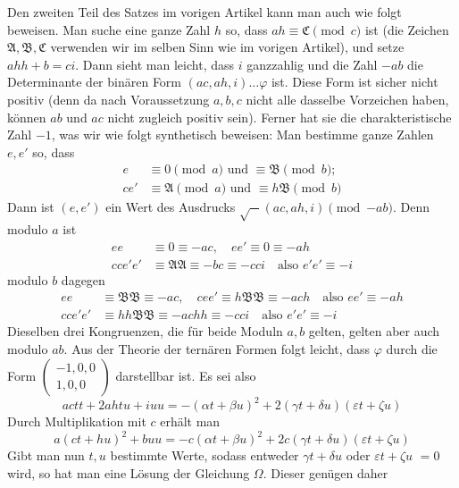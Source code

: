 Den zweiten Teil des Satzes im vorigen Artikel kann man auch
wie folgt beweisen. Man suche eine ganze Zahl \(h\) so,
dass \(ah\equiv\mathfrak C\pmod c\) ist (die Zeichen \(\mathfrak A,\mathfrak B,\mathfrak C\) verwenden wir im selben
Sinn wie im vorigen Artikel), und setze \(ahh+b=ci\). Dann sieht
man leicht, dass \(i\) ganzzahlig und die Zahl \(-ab\) die
Determinante der binären Form \((ac,ah,i)\ldots\varphi\) ist. Diese Form ist
sicher nicht positiv (denn da nach Voraussetzung \(a,b,c\)
nicht alle dasselbe Vorzeichen haben, können \(ab\) und
\(ac\) nicht zugleich positiv sein). Ferner hat sie die
charakteristische Zahl \(-1\), was wir wie folgt synthetisch
beweisen: Man bestimme ganze Zahlen \(e,e'\) so, dass
\[
\begin{aligned}
e&\equiv0\pmod a\text{ und }\equiv\mathfrak B\pmod b;\\
ce'&\equiv\mathfrak A\pmod a\text{ und }\equiv h\mathfrak B\pmod b
\end{aligned}
\]
Dann ist \((e,e')\) ein Wert des Ausdrucks \(\surd-(ac,ah,i)\pmod{-ab}\). Denn modulo
\(a\) ist
\[
\begin{aligned}
ee&\equiv0\equiv-ac,\quad ee'\equiv0\equiv-ah\\
cce'e'&\equiv\mathfrak A\mathfrak A\equiv-bc\equiv-cci\quad\text{also }e'e'\equiv-i
\end{aligned}
\]
modulo \(b\) dagegen
\[
\begin{aligned}
ee&\equiv\mathfrak B\mathfrak B\equiv-ac,\quad cee'\equiv h\mathfrak B\mathfrak B\equiv-ach\quad\text{also }ee'\equiv-ah\\
cce'e'&\equiv hh\mathfrak B\mathfrak B\equiv-achh\equiv-cci\quad\text{also }e'e'\equiv-i
\end{aligned}
\]
Dieselben drei Kongruenzen, die für beide Moduln \(a,b\)
gelten, gelten aber auch modulo \(ab\). Aus der Theorie
der ternären Formen folgt leicht, dass \(\varphi\) durch die
Form \(\left(\begin{smallmatrix}-1,0,0\\1,0,0\end{smallmatrix}\right)\) darstellbar ist. Es sei also
\[
actt+2ahtu+iuu=-(\alpha t+\beta u)^2+2(\gamma t+\delta u)(\varepsilon t+\zeta u)
\]
Durch Multiplikation mit \(c\) erhält man
\[
a(ct+hu)^2+buu=-c(\alpha t+\beta u)^2+2c(\gamma t+\delta u)(\varepsilon t+\zeta u)
\]
Gibt man nun \(t,u\) bestimmte Werte, sodass entweder
\(\gamma t+\delta u\) oder \(\varepsilon t+\zeta u\) \(=0\) wird, so hat man
eine Lösung der Gleichung \(\Omega\). Dieser genügen daher
